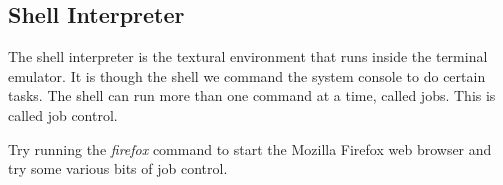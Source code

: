 
\subsection{Shell Interpreter} %
\label{sec:shell}

The shell interpreter is the textural environment that
runs inside the terminal emulator. It is though the shell
we command the system console to do certain tasks. The
shell can run more than one command at a time, called jobs.
This is called job control.

\begin{prob}
	Try running the \emph{firefox} command to start the
	Mozilla Firefox web browser and try some various bits
	of job control.
\end{prob}
